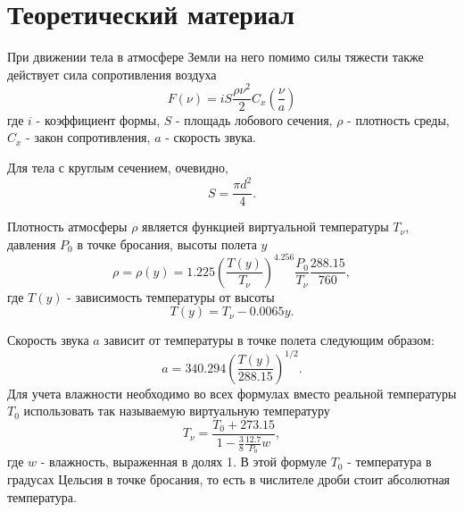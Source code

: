 \documentclass{report}
\begin{document}
\section*{Теоретический материал}
При движении тела в атмосфере Земли на него помимо силы тяжести также действует сила сопротивления воздуха
\begin{equation} \label{c13eq1}
	F(\nu) = i S \frac{\rho \nu^2}{2} C_x \left( \frac{\nu}{a} \right)
\end{equation}
где $i$ - коэффициент формы, $S$ - площадь лобового сечения, $\rho$ - плотность среды, $C_x$ - закон сопротивления, $a$ - скорость звука.

Для тела с круглым сечением, очевидно, 
\begin{equation} \label{c13eq2}
	S = \frac{\pi d^2}{4}.
\end{equation}

Плотность атмосферы $\rho$ является функцией виртуальной температуры $T_\nu$, давления $P_0$ в точке бросания, высоты полета $y$
\begin{equation} \label{c13eq3}
	\rho = \rho(y) = 1.225 \left( \frac{T(y)}{T_\nu} \right)^{4.256} \frac{P_0}{T_\nu} \frac{288.15}{760},
\end{equation}
где $T(y)$ - зависимость температуры от высоты
\begin{equation} \label{c13eq4}
	T(y) = T_\nu - 0.0065y.
\end{equation}

Скорость звука $a$ зависит от температуры в точке полета следующим образом:
\begin{equation} \label{c13eq5}
	a = 340.294 \left( \frac{T(y)}{288.15} \right)^{1/2}.
\end{equation}
Для учета влажности необходимо во всех формулах вместо реальной температуры $T_0$ использовать так называемую виртуальную температуру
\begin{equation} \label{c13eq6}
	T_\nu = \frac{T_0 + 273.15}{1 - \displaystyle \frac{3}{8} \frac{12.7}{P_0} w},
\end{equation}
где $w$ - влажность, выраженная в долях 1. В этой формуле $T_0$ - температура в градусах Цельсия в точке бросания, то есть в числителе дроби стоит абсолютная температура.
\end{document}
